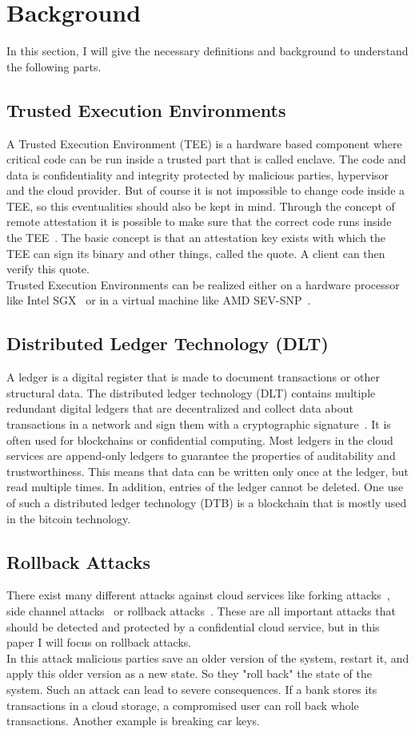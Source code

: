 \section{Background}
In this section, I will give the necessary definitions and background to understand the following parts. 
\subsection{Trusted Execution Environments}
A Trusted Execution Environment (TEE) is a hardware based component where critical code can be run inside a trusted part that is called enclave. The code and data is confidentiality and integrity protected by malicious parties, hypervisor and the cloud provider.  But of course it is not impossible to change code inside a TEE, so this eventualities should also be kept in mind. Through the concept of remote attestation it is possible to make sure that the correct code runs inside the TEE~\cite{remoteAttestation}.  The basic concept is that an attestation key exists with which the TEE can sign its binary and other things, called the quote. A client can then verify this quote. \\ %
Trusted Execution Environments can be realized either on a hardware processor like Intel SGX~\cite{sgx} or in a virtual machine like AMD SEV-SNP~\cite{amd}.%
\subsection{Distributed Ledger Technology (DLT)}
A ledger is a digital register that is made to document transactions or other structural data. The distributed ledger technology (DLT) contains multiple redundant digital ledgers that are decentralized and collect data about transactions in a network and sign them with a cryptographic signature~\cite{ledger}. It is often used for blockchains or confidential computing. Most ledgers in the cloud services are append-only ledgers to guarantee the properties of auditability and trustworthiness. This means that data can be written only once at the ledger, but read multiple times. In addition, entries of the ledger cannot be deleted. One use of such a distributed ledger technology (DTB) is a blockchain that is mostly used in the bitcoin technology. %
\subsection{Rollback Attacks}
There exist many different attacks against cloud services like forking attacks~\cite{forkingAttacks}, side channel attacks~\cite{sideChannel} or rollback attacks~\cite{Rollback}. These are all important attacks that should be detected and protected by a confidential cloud service, but in this paper I will focus on rollback attacks.\\
In this attack malicious parties save an older version of the system, restart it, and apply this older version as a new state. So they "roll back" the state of the system. Such an attack can lead to severe consequences. If a bank stores its transactions in a cloud storage, a compromised user can roll back whole transactions. Another example is breaking car keys. %